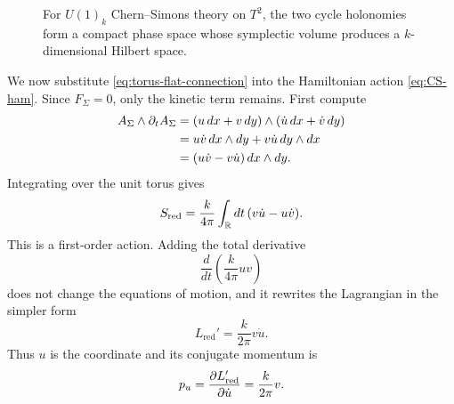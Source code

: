 \begin{figure}[h]
    \centering
    
    \caption{For $U(1)_k$ Chern--Simons theory on $T^2$, the two cycle holonomies form a compact phase space whose symplectic volume produces a $k$-dimensional Hilbert space.}
    \label{fig:torus-holonomies}
\end{figure}

\medskip

\noindent We now substitute \eqref{eq:torus-flat-connection} into the Hamiltonian action \eqref{eq:CS-ham}. Since $F_\Sigma=0$, only the kinetic term remains. First compute
\begin{align*}
A_\Sigma\wedge \partial_t A_\Sigma
&=
(u\,dx + v\,dy)\wedge(\dot u\,dx + \dot v\,dy) \\
&=
u\dot v\, dx\wedge dy + v\dot u\, dy\wedge dx \\
&=
(u\dot v - v\dot u)\,dx\wedge dy.
\end{align*}
Integrating over the unit torus gives
\begin{equation}\label{eq:reduced-action-first}
S_{\mathrm{red}}
=
\frac{k}{4\pi}\int_{\mathbb{R}} dt\,(v\dot u - u\dot v).
\end{equation}
This is a first-order action. Adding the total derivative
\begin{equation*}
\frac{d}{dt}\left(\frac{k}{4\pi}uv\right)
\end{equation*}
does not change the equations of motion, and it rewrites the Lagrangian in the simpler form
\begin{equation}\label{eq:reduced-action-canonical}
L_{\mathrm{red}}' = \frac{k}{2\pi}v\dot u.
\end{equation}
Thus $u$ is the coordinate and its conjugate momentum is
\begin{equation}\label{eq:canonical-momentum}
p_u = \frac{\partial L'_{\mathrm{red}}}{\partial \dot u} = \frac{k}{2\pi}v.
\end{equation}

\medskip

